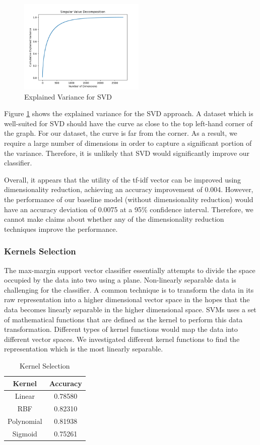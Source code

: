 \documentclass{article}
\begin{document}
\begin{figure}
\includegraphics[width=6cm]{svd.PNG}
\caption{Explained Variance for SVD}
\label{img:svd}
\end{figure} 

Figure \ref{img:svd} shows the explained variance for the SVD approach. A dataset which is well-suited for SVD should have the curve as close to the top left-hand corner of the graph. For our dataset, the curve is far from the corner. As a result, we require a large number of dimensions in order to capture a significant portion of the variance. Therefore, it is unlikely that SVD would significantly improve our classifier.

Overall, it appears that the utility of the tf-idf vector can be improved using dimensionality reduction, achieving an accuracy improvement of 0.004. However, the performance of our baseline model (without dimensionality reduction) would have an accuracy deviation of 0.0075 at a 95\% confidence interval. Therefore, we cannot make claims about whether any of the dimensionality reduction techniques improve the performance.

\subsubsection*{Kernels Selection}
The max-margin support vector classifier essentially attempts to divide the space occupied by the data into two using a plane. Non-linearly separable data is challenging for the classifier. A common technique is to transform the data in its raw representation into a higher dimensional vector space in the hopes that the data becomes linearly separable in the higher dimensional space. SVMs uses a set of mathematical functions that are defined as the kernel to perform this data transformation. Different types of kernel functions would map the data into different vector spaces. We investigated different kernel functions to find the representation which is the most linearly separable.  

\begin{table}[h]
\centering
\begin{tabular}{|c|c|}
\hline
\textbf{Kernel}     & \textbf{Accuracy} \\ \hline
Linear     & 0.78580  \\ \hline
RBF        & 0.82310  \\ \hline
Polynomial & 0.81938  \\ \hline
Sigmoid    & 0.75261  \\ \hline
\end{tabular}
\caption{Kernel Selection}
\label{kernels}
\end{table}
\end{document}
